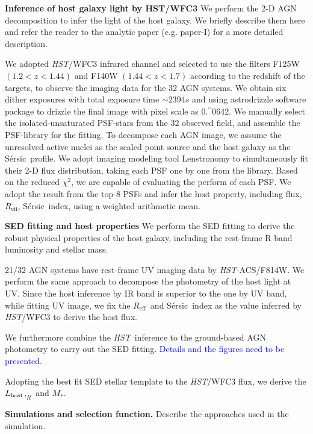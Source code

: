 \documentclass{natureprintstyle}
\newcommand{\hst}{{\it HST}}
\newcommand{\lhost}{$L_{\rm host}$}
\newcommand{\sersic}{S\'ersic}
\newcommand{\lenstronomy}{{\sc Lenstronomy}}
\newcommand{\reff}{{$R_{\mathrm{eff}}$}}
\newcommand{\mstar}{{$M_*$}}
\newcommand{\farcs}{\mbox{\ensuremath{.\!\!^{\prime\prime}}}}%
\begin{document}
\textbf{Inference of host galaxy light by HST/WFC3} We perform the 2-D AGN decomposition to infer the light of the host galaxy. We briefly describe them here and refer the reader to the analytic paper (e.g. paper-I) for a more detailed description.%

We adopted \hst/WFC3 infrared channel and selected to use the filters F125W $(1.2<z<1.44)$ and F140W $(1.44<z<1.7)$ according to the redshift of the targets, to observe the imaging data for the 32 AGN systems. We obtain six dither exposures with total exposure time $\sim2394s$ and using  {\sc astrodrizzle} software package to drizzle the final image with pixel scale as 0\farcs0642. We manually select the isolated-unsaturated PSF-stars from the 32 observed field, and assemble the PSF-library for the fitting. To decompose each AGN image, we assume the unresolved active nuclei as the scaled point source and the host galaxy as the \sersic\ profile. We adopt imaging modeling tool \lenstronomy\cite{lenstronomy} to simultaneously fit their 2-D flux distribution, taking each PSF one by one from the library. Based on the reduced $\chi^2$, we are capable of evaluating the perform of each PSF. We adopt the result from the top-8 PSFs and infer the host property, including flux, \reff, \sersic\ index, using a weighted arithmetic mean.

\textbf{SED fitting and host properties}
We perform the SED fitting to derive the robust physical properties of the host galaxy, including the rest-frame R band luminosity and stellar mass. 

21/32 AGN systems have rest-frame UV imaging data by \hst-ACS/F814W\cite{Scoville2007}. We perform the same approach to decompose the photometry of the host light at UV. Since the host inference by IR band is superior to the one by UV band, while fitting UV image, we fix the \reff\ and \sersic\ index as the value inferred by \hst/WFC3 to derive the host flux.

We furthermore combine the \hst\ inference to the ground-based AGN photometry to carry out the SED fitting. \textcolor{blue}{Details and the figures need to be presented.}

Adopting the best fit SED stellar template to the \hst/WFC3 flux, we derive the \lhost${,_R}$ and \mstar.


\textbf{Simulations and selection function.} 
Describe the approaches used in the simulation.

\end{document}
